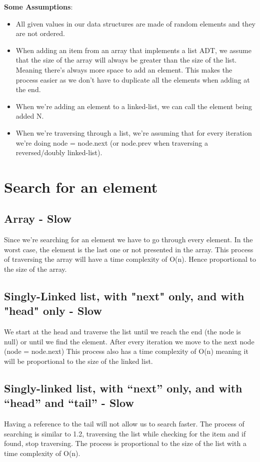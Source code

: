 \documentclass{article}
\begin{document}
\textbf{Some Assumptions}:
\begin{itemize}
    \item All given values in our data structures are made of random elements and they are not ordered.
    \item When adding an item from an array that implements a list ADT, we assume that the size of the array will always be greater than the size of the list. Meaning there's always more space to add an element. This makes the process easier as we don't have to duplicate all the elements when adding at the end.
    \item When we're adding an element to a linked-list, we can call the element being added N.
    \item When we're traversing through a list, we're assuming that for every iteration we're doing node = node.next (or node.prev when traversing a reversed/doubly linked-list). 
\end{itemize}



\section{Search for an element}
\subsection{Array - Slow}
Since we're searching for an element we have to go through every element. In the worst case, the element is the last one or not presented in the array. This process of traversing the array will have a time complexity of O(n). Hence proportional to the size of the array.

\subsection{Singly-Linked list, with "next" only, and with "head" only - Slow}
We start at the head and traverse the list until we reach the end (the node is null) or until we find the element. After every iteration we move to the next node (node = node.next) This process also has a time complexity of O(n) meaning it will be proportional to the size of the linked list.

\subsection{Singly-linked list, with “next” only, and with “head” and “tail” - Slow}
Having a reference to the tail will not allow us to search faster. The process of searching is similar to 1.2, traversing the list while checking for the item and if found, stop traversing. The process is proportional to the size of the list with a time complexity of O(n).
\end{document}
